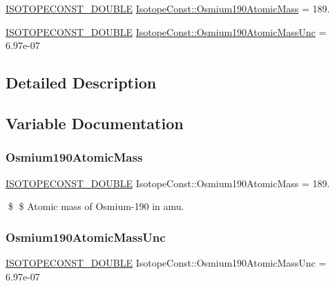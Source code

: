 \begin{DoxyCompactItemize}
\item 
\mbox{\hyperlink{group___isotope_const-_macros_ga8f45a7272ce02c0b4c65c44636ed719a}{I\+S\+O\+T\+O\+P\+E\+C\+O\+N\+S\+T\+\_\+\+D\+O\+U\+B\+LE}} \mbox{\hyperlink{group___isotope_const-_osmium-_os190_ga6a61a525d4e1ac6cb04dd908677cffa0}{Isotope\+Const\+::\+Osmium190\+Atomic\+Mass}} = 189.
\item 
\mbox{\hyperlink{group___isotope_const-_macros_ga8f45a7272ce02c0b4c65c44636ed719a}{I\+S\+O\+T\+O\+P\+E\+C\+O\+N\+S\+T\+\_\+\+D\+O\+U\+B\+LE}} \mbox{\hyperlink{group___isotope_const-_osmium-_os190_gaa3c57ce0bf346e7bd8c716ea6e5459e7}{Isotope\+Const\+::\+Osmium190\+Atomic\+Mass\+Unc}} = 6.\+97e-\/07
\end{DoxyCompactItemize}


\subsection{Detailed Description}


\subsection{Variable Documentation}
\mbox{\label{group___isotope_const-_osmium-_os190_ga6a61a525d4e1ac6cb04dd908677cffa0}} 
\subsubsection{\texorpdfstring{Osmium190\+Atomic\+Mass}{Osmium190AtomicMass}}
{\footnotesize\ttfamily \mbox{\hyperlink{group___isotope_const-_macros_ga8f45a7272ce02c0b4c65c44636ed719a}{I\+S\+O\+T\+O\+P\+E\+C\+O\+N\+S\+T\+\_\+\+D\+O\+U\+B\+LE}} Isotope\+Const\+::\+Osmium190\+Atomic\+Mass = 189.}

\$ \$ Atomic mass of Osmium-\/190 in amu. \mbox{\label{group___isotope_const-_osmium-_os190_gaa3c57ce0bf346e7bd8c716ea6e5459e7}} 
\subsubsection{\texorpdfstring{Osmium190\+Atomic\+Mass\+Unc}{Osmium190AtomicMassUnc}}
{\footnotesize\ttfamily \mbox{\hyperlink{group___isotope_const-_macros_ga8f45a7272ce02c0b4c65c44636ed719a}{I\+S\+O\+T\+O\+P\+E\+C\+O\+N\+S\+T\+\_\+\+D\+O\+U\+B\+LE}} Isotope\+Const\+::\+Osmium190\+Atomic\+Mass\+Unc = 6.\+97e-\/07}

